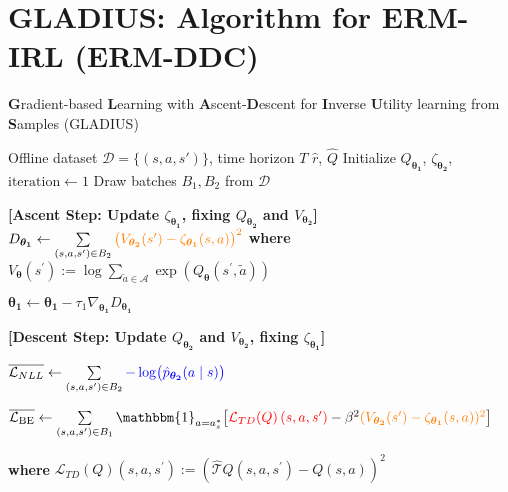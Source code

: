 \section{GLADIUS: Algorithm for ERM-IRL (ERM-DDC)}
\label{sec:Algorithm} 



\begin{algorithm}
\caption{\textbf{G}radient-based \textbf{L}earning with \textbf{A}scent-\textbf{D}escent for \textbf{I}nverse \textbf{U}tility learning from \textbf{S}amples (GLADIUS)}
\label{alg:estimation1}
\begin{algorithmic}[1]
\Require Offline dataset $\mathcal{D}=\{(s, a, s')\}$, time horizon $T$
\Ensure $\widehat{r}$, $\widehat{Q}$
\State Initialize $Q_{\boldsymbol{\theta_1}}$, $\zeta_{\boldsymbol{\theta_2}}$, $\text{iteration} \gets 1$
    \State Draw batches $B_1, B_2$ from $\mathcal{D}$
    
    \State \textbf{[Ascent Step: Update $ \zeta_{\boldsymbol{\theta_1}}$, fixing $Q_{\boldsymbol{\theta_2}}$ and $V_{\boldsymbol{\theta_2}}$]}
    \State $D_{\boldsymbol{\theta_1}} \gets \sum\limits_{(s, a, s^\prime)\in B_2} 
    \textcolor{orange}{\bigl(V_{\boldsymbol{\theta_2}}(s^\prime) 
    - \zeta_{\boldsymbol{\theta_1}}(s, a)\bigr)^2}$
    \State \textbf{where} $V_{\boldsymbol{\theta}}(s^\prime) := \log \sum_{\tilde{a} \in \mathcal{A}} \exp(Q_{\boldsymbol{\theta}}(s^\prime, \tilde{a}))$
    
    \State $\boldsymbol{\theta_1} \gets \boldsymbol{\theta_1} - \tau_1 \nabla_{\boldsymbol{\theta_1}} D_{\boldsymbol{\theta_1}}$
    
    \State \textbf{[Descent Step: Update $Q_{\boldsymbol{\theta_2}}$ and $V_{\boldsymbol{\theta_2}}$, fixing $\zeta_{\boldsymbol{\theta_1}}$]}
    
    \State $\overline{\mathcal{L}_{NLL}} \gets  \sum\limits_{(s, a, s^\prime)\in B_2}
    \textcolor{blue}{-\log\bigl(\hat{p}_{\boldsymbol{\theta_2}}(a \mid s)\bigr)}$
    
    \State $\overline{\mathcal{L}_{\mathrm{BE}}} \gets \sum\limits_{(s, a, s^\prime)\in B_1} 
    \mathbbm{1}_{a = a^*_s} \bigl[\textcolor{red}{\mathcal{L}_{TD}(Q)\left(s, a, s^{\prime}\right)} - \beta^2 \textcolor{orange}{( V_{\boldsymbol{\theta_2}}(s^\prime)- \zeta_{\boldsymbol{\theta_1}}(s,a))^2}\bigr]$
    
    \State \textbf{where} $\mathcal{L}_{TD}(Q)\left(s, a, s^{\prime}\right) := \left(\hat{\mathcal{T}} Q\left(s, a, s^{\prime}\right)-Q(s, a)\right)^2$
    

\end{algorithmic}
\end{algorithm}
